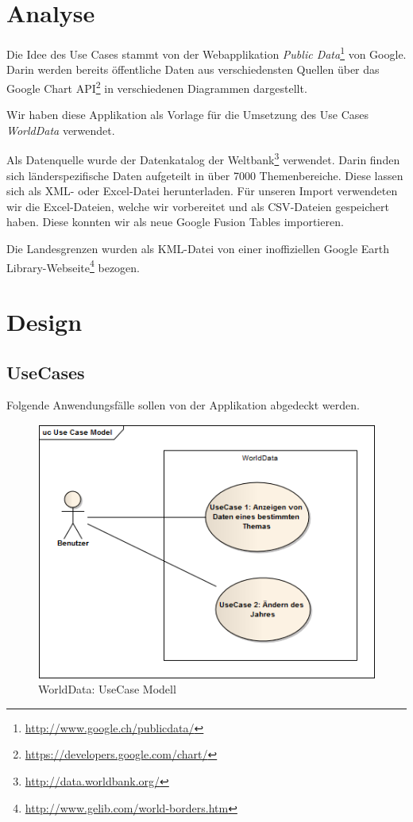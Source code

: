 \section{Analyse}
Die Idee des Use Cases stammt von der Webapplikation \emph{Public Data}\footnote{\url{http://www.google.ch/publicdata/}} von Google. Darin werden bereits öffentliche Daten aus verschiedensten Quellen über das Google Chart API\footnote{\url{https://developers.google.com/chart/}} in verschiedenen Diagrammen dargestellt.

Wir haben diese Applikation als Vorlage für die Umsetzung des Use Cases \emph{WorldData} verwendet. 

Als Datenquelle wurde der Datenkatalog der Weltbank\footnote{\url{http://data.worldbank.org/}} verwendet. Darin finden sich länderspezifische Daten aufgeteilt in über 7000 Themenbereiche. Diese lassen sich als \gls{XML}- oder Excel-Datei herunterladen. Für unseren Import verwendeten wir die Excel-Dateien, welche wir vorbereitet und als \gls{CSV}-Dateien gespeichert haben. Diese konnten wir als neue Google Fusion Tables importieren.

Die Landesgrenzen wurden als \gls{KML}-Datei von einer inoffiziellen Google Earth Library-Webseite\footnote{\url{http://www.gelib.com/world-borders.htm}} bezogen. 

\section{Design}

\subsection{UseCases}
Folgende Anwendungsfälle sollen von der Applikation abgedeckt werden.

\begin{figure}[H]
	\centering
	\includegraphics[scale=0.8]{images/usecase1-worlddata/uml/worlddata-usecasemodel.png}
	\caption{WorldData: UseCase Modell}
	\label{worlddata-usecasemodel}
\end{figure}

